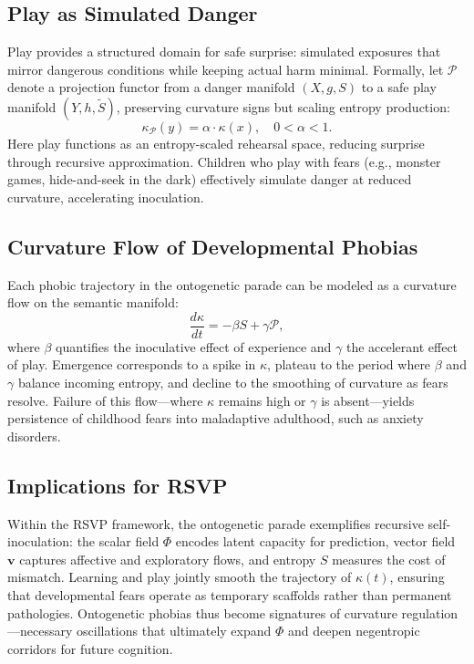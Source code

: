 \documentclass{article}
\theoremstyle{definition}
\begin{document}
\subsection{Play as Simulated Danger}

Play provides a structured domain for safe surprise: simulated exposures that
mirror dangerous conditions while keeping actual harm minimal. Formally, let
$\mathcal{P}$ denote a projection functor from a danger manifold
$(X, g, S)$ to a safe play manifold $(Y, h, \tilde S)$, preserving curvature
signs but scaling entropy production:
\[
\kappa_{\mathcal{P}}(y) = \alpha \cdot \kappa(x), \quad 0 < \alpha < 1.
\]
Here play functions as an entropy-scaled rehearsal space, reducing surprise
through recursive approximation. Children who play with fears (e.g., monster
games, hide-and-seek in the dark) effectively simulate danger at reduced
curvature, accelerating inoculation.

\subsection{Curvature Flow of Developmental Phobias}

Each phobic trajectory in the ontogenetic parade can be modeled as a curvature
flow on the semantic manifold:
\[
\frac{d\kappa}{dt} = - \beta S + \gamma \mathcal{P},
\]
where $\beta$ quantifies the inoculative effect of experience and $\gamma$ the
accelerant effect of play. Emergence corresponds to a spike in $\kappa$, plateau
to the period where $\beta$ and $\gamma$ balance incoming entropy, and decline to
the smoothing of curvature as fears resolve. Failure of this flow---where
$\kappa$ remains high or $\gamma$ is absent---yields persistence of childhood
fears into maladaptive adulthood, such as anxiety disorders.

\subsection{Implications for RSVP}

Within the RSVP framework, the ontogenetic parade exemplifies recursive
self-inoculation: the scalar field $\Phi$ encodes latent capacity for prediction,
vector field $\mathbf{v}$ captures affective and exploratory flows, and entropy
$S$ measures the cost of mismatch. Learning and play jointly smooth the
trajectory of $\kappa(t)$, ensuring that developmental fears operate as
temporary scaffolds rather than permanent pathologies. Ontogenetic phobias thus
become signatures of curvature regulation---necessary oscillations that
ultimately expand $\Phi$ and deepen negentropic corridors for future cognition.
\end{document}
